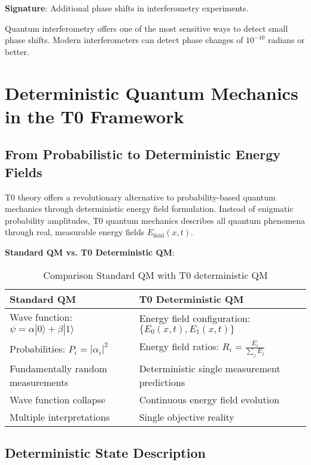 \documentclass[12pt,a4paper]{article}
\theoremstyle{definition}
\theoremstyle{remark}
\begin{document}
	\textbf{Signature}: Additional phase shifts in interferometry experiments.
	
	Quantum interferometry offers one of the most sensitive ways to detect small phase shifts. Modern interferometers can detect phase changes of $10^{-10}$ radians or better.
	
	\section{Deterministic Quantum Mechanics in the T0 Framework}
	
	\subsection{From Probabilistic to Deterministic Energy Fields}
	
	T0 theory offers a revolutionary alternative to probability-based quantum mechanics through deterministic energy field formulation. Instead of enigmatic probability amplitudes, T0 quantum mechanics describes all quantum phenomena through real, measurable energy fields $E_{\text{field}}(x,t)$.
	
	\textbf{Standard QM vs. T0 Deterministic QM}:
	\begin{table}[htbp]
		\centering
		\begin{tabular}{|p{6cm}|p{8cm}|}
			\hline
			\textbf{Standard QM} & \textbf{T0 Deterministic QM} \\
			\hline
			Wave function: $\psi = \alpha|0\rangle + \beta|1\rangle$ & Energy field configuration: $\{E_0(x,t), E_1(x,t)\}$ \\
			\hline
			Probabilities: $P_i = |\alpha_i|^2$ & Energy field ratios: $R_i = \frac{E_i}{\sum_j E_j}$ \\
			\hline
			Fundamentally random measurements & Deterministic single measurement predictions \\
			\hline
			Wave function collapse & Continuous energy field evolution \\
			\hline
			Multiple interpretations & Single objective reality \\
			\hline
		\end{tabular}
		\caption{Comparison Standard QM with T0 deterministic QM}
	\end{table}
	
	\subsection{Deterministic State Description}
	
\end{document}
